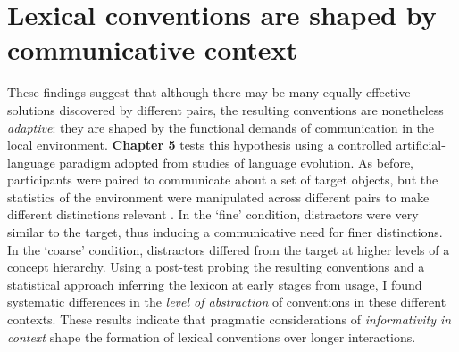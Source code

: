 \documentclass[11pt]{article}
\begin{document}
\vspace{1cm}

\section*{Lexical conventions are shaped by communicative context}

These findings suggest that although there may be many equally effective solutions discovered by different pairs, the resulting conventions are nonetheless \emph{adaptive}: they are shaped by the functional demands of communication in the local environment.
\textbf{Chapter 5} tests this hypothesis using a controlled artificial-language paradigm adopted from studies of language evolution.
As before, participants were paired to communicate about a set of target objects, but the statistics of the environment were manipulated across different pairs to make different distinctions relevant \cite{hawkins_emerging_abstractions_2018}. 
In the `fine' condition, distractors were very similar to the target, thus inducing a communicative need for finer distinctions. 
In the `coarse' condition, distractors differed from the target at higher levels of a concept hierarchy.  
Using a post-test probing the resulting conventions and a statistical approach inferring the lexicon at early stages from usage, I found systematic differences in the \emph{level of abstraction} of conventions in these different contexts. 
These results indicate that pragmatic considerations of \textit{informativity in context} shape the formation of lexical conventions over longer interactions.
\end{document}
